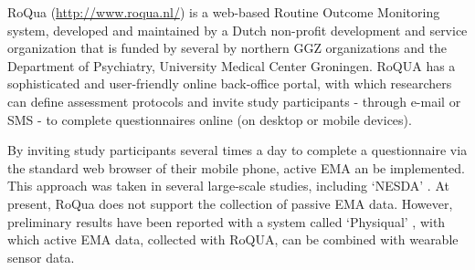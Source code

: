 \documentclass[]{book}
\begin{document}
RoQua (\url{http://www.roqua.nl/}) is a web-based Routine Outcome
Monitoring system, developed and maintained by a Dutch non-profit
development and service organization that is funded by several by
northern GGZ organizations and the Department of Psychiatry, University
Medical Center Groningen. RoQUA has a sophisticated and user-friendly
online back-office portal, with which researchers can define assessment
protocols and invite study participants - through e-mail or SMS - to
complete questionnaires online (on desktop or mobile devices).

By inviting study participants several times a day to complete a
questionnaire via the standard web browser of their mobile phone, active
EMA an be implemented. This approach was taken in several large-scale
studies, including `NESDA' \citep[\url{http://nesda.nl}; see also
Chapter \ref{catalogue}) and `HowNutsAreTheDutch'
(\url{http://www.hoegekis.nl};][]{VanDerKrieke2017, VanDerKrieke2016}.
At present, RoQua does not support the collection of passive EMA data.
However, preliminary results have been reported with a system called
`Physiqual' \citep{Blaauw2016}, with which active EMA data, collected
with RoQUA, can be combined with wearable sensor data.
\end{document}
